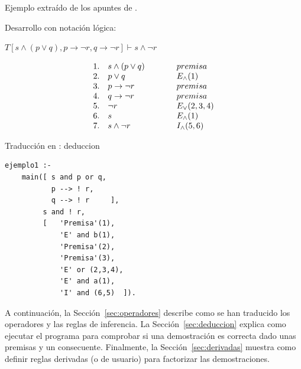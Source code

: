 \documentclass[12pt, a4paper]{urjc}
\newcommand{\scasp}[1][]{\href{https://ciao-lang.org/playground/scasp.html}{\color{black}\faExternalLink*}}
\begin{document}
\begin{ejm}\label{exa:eje}
  Ejemplo extraído de los apuntes de \citet{arias22logica}.

  \medskip

\hspace*{-1.5em}\begin{minipage}[t]{.49\linewidth}
  Desarrollo con notación lógica:

  \bigskip

$T[s \land (p \lor q), p \rightarrow \lnot r, q \rightarrow \lnot
r] \vdash s \land \lnot r$

\[
  \begin{array}{lll}
    1. &  s \land (p \lor q)\hspace*{1cm} & premisa\\
    2. &  p \lor q & E_{\land} (1) \\
    3. &  p \rightarrow  \lnot r &   premisa\\
    4. &  q \rightarrow  \lnot r&  premisa \\
    5. &  \lnot r& E_{\lor} (2,3,4)  \\
    6. &  s& E_{\land} (1)\\
    7. &  s \land \lnot r & I_{\land} (5,6)\\
  \end{array}
\]

\end{minipage}
\vrule\hspace*{.25em}
\begin{minipage}[t]{.49\linewidth}
  Traducción en :
  \hfill \scasp{deduccion}

  \medskip

\begin{lstlisting}[style=MyProlog]
ejemplo1 :-
    main([ s and p or q,
           p --> ! r,
           q --> ! r     ],
         s and ! r,
         [   'Premisa'(1),
             'E' and b(1),
             'Premisa'(2),
             'Premisa'(3),
             'E' or (2,3,4),
             'E' and a(1),
             'I' and (6,5)  ]).
\end{lstlisting}

\end{minipage}
\end{ejm}


A continuación, la Sección~\ref{sec:operadores} describe como se han
traducido los operadores y las reglas de inferencia. La
Sección~\ref{sec:deduccion} explica como ejecutar el programa para
comprobar si una demostración es correcta dado unas premisas y un
consecuente. Finalmente, la Sección~\ref{sec:derivadas} muestra como
definir reglas derivadas (o de usuario) para factorizar las
demostraciones.
\end{document}
